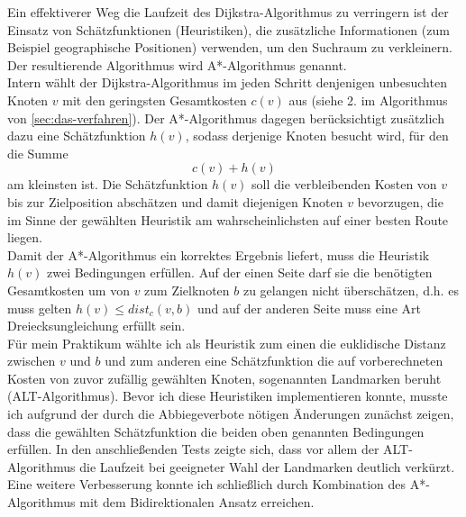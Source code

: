 \documentclass[twoside, a4paper]{scrartcl}
\begin{document}
Ein effektiverer Weg die Laufzeit des Dijkstra-Algorithmus zu verringern ist der Einsatz von Schätzfunktionen (Heuristiken), die zusätzliche Informationen (zum Beispiel geographische Positionen)  verwenden, um den Suchraum zu verkleinern. Der resultierende Algorithmus wird A*-Algorithmus genannt.\\
Intern wählt der Dijkstra-Algorithmus im jeden Schritt denjenigen unbesuchten Knoten $v$ mit den geringsten Gesamtkosten $c(v)$ aus (siehe 2. im Algorithmus von \ref{sec:das-verfahren}). Der A*-Algorithmus dagegen berücksichtigt zusätzlich dazu eine Schätzfunktion $h(v)$, sodass derjenige Knoten besucht wird, für den die Summe 
\begin{equation}
  \label{eq:1}
  c(v) + h(v)   
\end{equation}
am kleinsten ist. Die Schätzfunktion $h(v)$ soll die verbleibenden Kosten von $v$ bis zur Zielposition abschätzen und damit diejenigen Knoten $v$ bevorzugen, die im Sinne der gewählten Heuristik am wahrscheinlichsten auf einer besten Route liegen. \\
Damit der A*-Algorithmus ein korrektes Ergebnis liefert, muss die Heuristik $h(v)$ zwei Bedingungen erfüllen. Auf der einen Seite darf sie die benötigten Gesamtkosten um von $v$ zum Zielknoten $b$ zu gelangen nicht überschätzen, d.h. es muss gelten $h(v) \leq dist_c(v,b)$ und auf der anderen Seite muss eine Art Dreiecksungleichung erfüllt sein. \\
Für mein Praktikum wählte ich als Heuristik zum einen die euklidische Distanz zwischen $v$ und $b$ und zum anderen eine Schätzfunktion die auf vorberechneten Kosten von zuvor zufällig gewählten Knoten, sogenannten Landmarken beruht (ALT-Algorithmus).  
Bevor ich diese Heuristiken implementieren konnte, musste ich aufgrund der durch die Abbiegeverbote nötigen Änderungen zunächst zeigen, dass die gewählten Schätzfunktion die beiden oben genannten Bedingungen erfüllen.  In den anschließenden Tests zeigte sich, dass vor allem der ALT-Algorithmus die Laufzeit bei geeigneter Wahl der Landmarken deutlich verkürzt. Eine weitere Verbesserung konnte ich schließlich durch Kombination des A*-Algorithmus mit dem Bidirektionalen Ansatz erreichen. 

\end{document}
